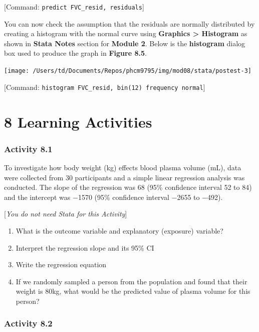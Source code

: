 \documentclass[
]{memoir}
\providecommand{\tightlist}{%
  \setlength{\itemsep}{0pt}\setlength{\parskip}{0pt}}
\begin{document}
{[}Command: \texttt{predict\ FVC\_resid,\ residuals}{]}

You can now check the assumption that the residuals are normally distributed by creating a histogram with the normal curve using \textbf{Graphics \textgreater{} Histogram} as shown in \textbf{Stata Notes} section for \textbf{Module 2}. Below is the \textbf{histogram} dialog box used to produce the graph in \textbf{Figure 8.5}.

\texttt{[image: /Users/td/Documents/Repos/phcm9795/img/mod08/stata/postest-3]}

{[}Command: \texttt{histogram\ FVC\_resid,\ bin(12)\ frequency\ normal}{]}

\hypertarget{learning-activities-7}{%
\chapter*{\texorpdfstring{\textbf{8} Learning Activities}{8 Learning Activities}}\label{learning-activities-7}}

\hypertarget{activity-8.1}{%
\subsection*{Activity 8.1}\label{activity-8.1}}

To investigate how body weight (kg) effects blood plasma volume (mL), data were collected from 30 participants and a simple linear regression analysis was conducted. The slope of the regression was 68 (95\% confidence interval 52 to 84) and the intercept was −1570 (95\% confidence interval −2655 to −492).

{[}\emph{You do not need Stata for this Activity}{]}

\begin{enumerate}
\def\labelenumi{\alph{enumi})}
\tightlist
\item
  What is the outcome variable and explanatory (exposure) variable?
\item
  Interpret the regression slope and its 95\% CI
\item
  Write the regression equation
\item
  If we randomly sampled a person from the population and found that their weight is 80kg, what would be the predicted value of plasma volume for this person?
\end{enumerate}

\hypertarget{activity-8.2}{%
\subsection*{Activity 8.2}\label{activity-8.2}}
\end{document}
